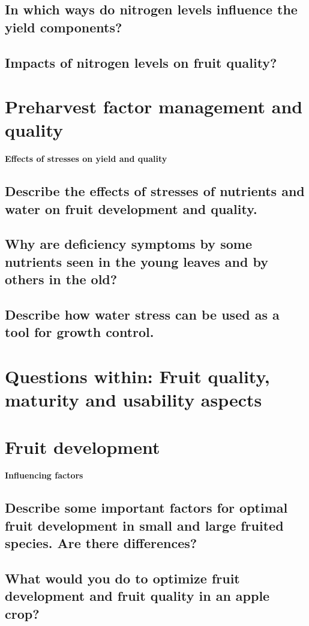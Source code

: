 \subsection{In which ways do nitrogen levels influence the yield components?}
\subsection{Impacts of nitrogen levels on fruit quality?}


\vspace{1em}
\section{Preharvest factor management and quality}
\textbf{Effects of stresses on yield and quality}

\subsection{Describe the effects of stresses of nutrients and water on fruit development and quality.}
\subsection{Why are deficiency symptoms by some nutrients seen in the young leaves and by others in the old?}
\subsection{Describe how water stress can be used as a tool for growth control.}

\vspace{1em}
\section*{Questions within: Fruit quality, maturity and usability aspects}
\section{Fruit development}
\textbf{Influencing factors}

\subsection{Describe some important factors for optimal fruit development in small and large fruited species. Are there differences?}
\subsection{What would you do to optimize fruit development and fruit quality in an apple crop?}
